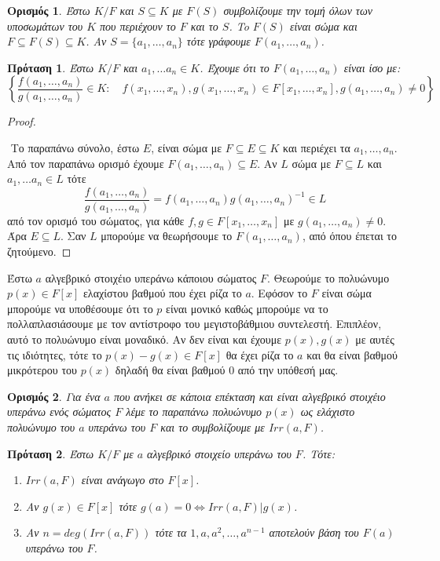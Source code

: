 \documentclass[oneside,a4paper]{article}
\newtheorem*{defn}{Ορισμός}
\newtheorem{prop}{Πρόταση}
\begin{document}
\begin{defn} Έστω $K/F$ και $S\subseteq K$ με $F(S)$ συμβολίζουμε την τομή όλων των υποσωμάτων του $K$ που περιέχουν το $F$ και το $S$. To $F(S)$ είναι σώμα και $F\subseteq F(S) \subseteq K$. Αν $S=\{a_1, \ldots, a_n\}$ τότε γράφουμε $F(a_1, \ldots, a_n)$.

\end{defn}

\begin{prop} Έστω $K/F$ και $a_1,\ldots a_n \in K$. Έχουμε ότι το $F(a_1, \ldots , a_n)$  είναι ίσο με:
	$$ \left\{\frac{f(a_1,\ldots,a_n)}{g(a_1,\ldots, a_n)} \in K: \quad f(x_1,\ldots,x_n), g(x_1,\ldots,x_n) \in F[x_1,\ldots,x_n] , g(a_1,\ldots,a_n)\neq 0\right\}$$
\end{prop}

\begin{proof} $ $
	
	$ $\newline
	Το παραπάνω σύνολο, έστω $E$, είναι σώμα με $F\subseteq E \subseteq K$ και περιέχει τα $a_1, \ldots, a_n$. Από τον παραπάνω ορισμό έχουμε $F(a_1,\ldots,a_n)\subseteq E$.
	Αν $L$ σώμα με $F \subseteq L$ και $a_1, \ldots a_n \in L$ τότε 
	$$\frac{f(a_1, \ldots, a_n)}{g(a_1,\ldots,a_n)} = f(a_1, \ldots, a_n) {g(a_1, \ldots, a_n)}^{-1} \in L$$
	από τον ορισμό του σώματος, για κάθε $f,g \in F[x_1,\ldots,x_n]$ με $ g(a_1, \ldots, a_n) \neq 0$. Άρα $E \subseteq L$. Σαν $L$ μπορούμε να θεωρήσουμε το $F(a_1, \ldots, a_n)$, από όπου έπεται το ζητούμενο.
\end{proof}

Έστω $a$ αλγεβρικό στοιχέιο υπεράνω κάποιου σώματος $F$. Θεωρούμε το πολυώνυμο $p(x) \in F[x]$ ελαχίστου βαθμού που έχει ρίζα το $a$. Εφόσον το $F$ είναι σώμα μπορούμε να υποθέσουμε ότι το $p$ είναι μονικό καθώς μπορούμε να το πολλαπλασιάσουμε με τον αντίστροφο του μεγιστοβάθμιου συντελεστή. Επιπλέον, αυτό το πολυώνυμο είναι μοναδικό. Αν δεν είναι και έχουμε $p(x), g(x)$ με αυτές τις ιδιότητες, τότε το $p(x)-g(x) \in F[x]$ θα έχει ρίζα το $a$ και θα είναι βαθμού μικρότερου του $p(x)$ δηλαδή θα είναι βαθμού 0 από την υπόθεσή μας.
\begin{defn} Για ένα $a$ που ανήκει σε κάποια επέκταση και είναι αλγεβρικό στοιχέιο υπεράνω ενός σώματος $F$ λέμε το παραπάνω πολυώνυμο $p(x)$ ως ελάχιστο πολυώνυμο του $a$ υπεράνω του $F$ και το συμβολίζουμε με $Irr(a,F)$. 
\end{defn}

\begin{prop}
	Έστω $K/F$ με $a$ αλγεβρικό στοιχείο υπεράνω του $F$. Τότε:
	\begin{enumerate}
		\item $Irr(a,F)$ είναι ανάγωγο στο $F[x]$.
		\item Αν $g(x) \in F[x]$ τότε $g(a) = 0 \iff Irr(a,F) | g(x)$.
		\item Αν $n = deg(Irr(a,F))$ τότε τα $1,a,a^2,\ldots,a^{n-1}$ αποτελούν βάση του $F(a)$ υπεράνω του $F$.
	\end{enumerate}
\end{prop}
\end{document}
